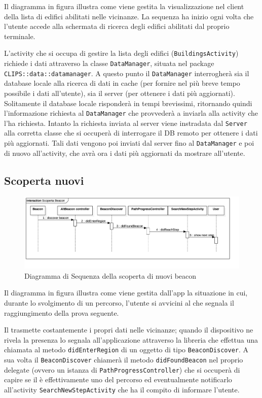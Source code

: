 Il diagramma in figura illustra come viene gestita la visualizzazione nel client della lista di edifici abilitati nelle vicinanze.
La sequenza ha inizio ogni volta che l'utente accede alla schermata di ricerca degli edifici abilitati dal proprio terminale.

L'activity che si occupa di gestire la lista degli edifici (\texttt{BuildingsActivity}) richiede i dati attraverso la classe \texttt{DataManager}, situata nel package \texttt{CLIPS::data::datamanager}.
A questo punto il \texttt{DataManager} interrogherà sia il database locale alla ricerca di dati in cache (per fornire nel più breve tempo possibile i dati all'utente), sia il server (per ottenere i dati più aggiornati).
Solitamente il database locale risponderà in tempi brevissimi, ritornando quindi l'informazione richiesta al \texttt{DataManager} che provvederà a inviarla alla activity che l'ha richiesta.
Intanto la richiesta inviata al server viene instradata dal \texttt{Server} alla corretta classe che si occuperà di interrogare il DB remoto per ottenere i dati più aggiornati.
Tali dati vengono poi inviati dal server fino al \texttt{DataManager} e poi di nuovo all'activity, che avrà ora i dati più aggiornati da mostrare all'utente.

\subsection{Scoperta nuovi }
\label{sub:Scoperta nuovi Beacon}

\begin{figure}[!h]
	\centering
   \includegraphics[scale=0.22]{img/diagrammiSequenza/scopertaBeacon.png}
   \caption{Diagramma di Sequenza della scoperta di nuovi beacon}
\end{figure}

Il diagramma in figura illustra come viene gestita dall'app la situazione in cui, durante lo svolgimento di un percorso, l'utente si avvicini al  che segnala il raggiungimento della prova seguente.

Il  trasmette costantemente i propri dati nelle vicinanze; quando il dispositivo ne rivela la presenza lo segnala all'applicazione attraverso la libreria  che effettua una chiamata al metodo \texttt{didEnterRegion} di un oggetto di tipo \texttt{BeaconDiscover}.
A sua volta il \texttt{BeaconDiscover} chiamerà il metodo \texttt{didFoundBeacon} nel proprio delegate (ovvero un istanza di \texttt{PathProgressController}) che si occuperà di capire se il  è effettivamente uno del percorso ed eventualmente notificarlo all'activity \texttt{SearchNewStepActivity} che ha il compito di informare l'utente.


